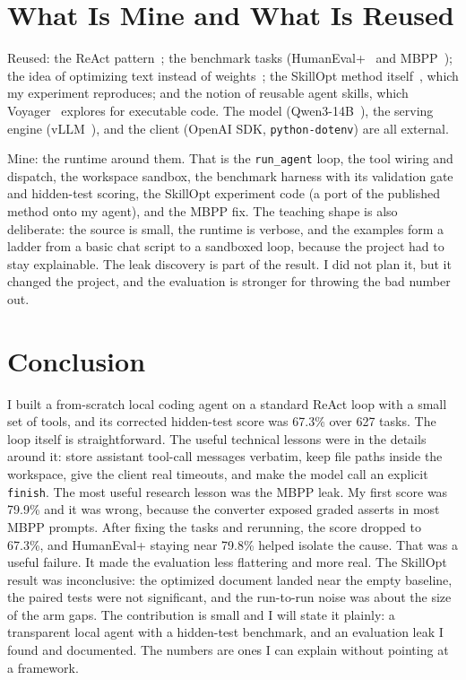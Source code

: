 \documentclass[11pt]{article}
\newcommand{\code}[1]{\texttt{\small #1}}
\begin{document}
\section{What Is Mine and What Is Reused}
Reused: the ReAct pattern~\cite{react}; the benchmark tasks (HumanEval+~\cite{humaneval,evalplus} and
MBPP~\cite{mbpp}); the idea of optimizing text instead of weights~\cite{textgrad,gepa,opro}; the SkillOpt
method itself~\cite{skillopt}, which my experiment reproduces; and the notion of reusable agent skills,
which Voyager~\cite{voyager} explores for executable code. The model (Qwen3-14B~\cite{qwen3}), the serving
engine (vLLM~\cite{vllm}), and the client (OpenAI SDK, \code{python-dotenv}) are all external.

Mine: the runtime around them. That is the \code{run\_agent} loop, the tool wiring and dispatch, the
workspace sandbox, the benchmark harness with its validation gate and hidden-test scoring, the SkillOpt
experiment code (a port of the published method onto my agent), and the MBPP fix. The teaching shape is
also deliberate: the source is small, the runtime is verbose, and the examples form a ladder from a basic
chat script to a sandboxed loop, because the project had to stay explainable. The leak discovery is part
of the result. I did not plan it, but it changed the project, and the evaluation is stronger for throwing
the bad number out.

\section{Conclusion}
I built a from-scratch local coding agent on a standard ReAct loop with a small set of tools, and its
corrected hidden-test score was 67.3\% over 627 tasks. The loop itself is straightforward. The useful
technical lessons were in the details around it: store assistant tool-call messages verbatim, keep file
paths inside the workspace, give the client real timeouts, and make the model call an explicit
\code{finish}. The most useful research lesson was the MBPP leak. My first score was 79.9\% and it was
wrong, because the converter exposed graded asserts in most MBPP prompts. After fixing the tasks and
rerunning, the score dropped to 67.3\%, and HumanEval+ staying near 79.8\% helped isolate the cause. That
was a useful failure. It made the evaluation less flattering and more real. The SkillOpt result was
inconclusive: the optimized document landed near the empty baseline, the paired tests were not
significant, and the run-to-run noise was about the size of the arm gaps. The contribution is small and I
will state it plainly: a transparent local agent with a hidden-test benchmark, and an evaluation leak I
found and documented. The numbers are ones I can explain without pointing at a framework.
\end{document}

